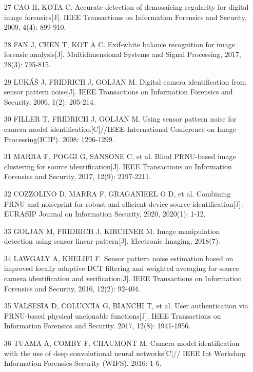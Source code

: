 \documentclass{article}
\begin{document}
\begin{itemize}
\item 
[27] CAO H, KOTA C. Accurate detection of demosaicing regularity for digital image forensics[J]. IEEE Transactions on Information Forensics and Security, 2009, 4(4): 899-910.

\item 
[28] FAN J, CHEN T, KOT A C. Exif-white balance recognition for image forensic analysis[J]. Multidimensional Systems and Signal Processing, 2017, 28(3): 795-815.

\item 
[29] LUKÁŠ J, FRIDRICH J, GOLJAN M. Digital camera identification from sensor pattern noise[J]. IEEE Transactions on Information Forensics and Security, 2006, 1(2): 205-214.

\item 
[30] FILLER T, FRIDRICH J, GOLJAN M. Using sensor pattern noise for camera model identification[C]//IEEE International Conference on Image Processing(ICIP). 2008: 1296-1299.

\item 
[31] MARRA F, POGGI G, SANSONE C, et al. Blind PRNU-based image clustering for source identification[J]. IEEE Transactions on Information Forensics and Security, 2017, 12(9): 2197-2211.

\item 
[32] COZZOLINO D, MARRA F, GRAGANIEEL O D, et al. Combining PRNU and noiseprint for robust and efficient device source identification[J]. EURASIP Journal on Information Security, 2020, 2020(1): 1-12.

\item 
[33] GOLJAN M, FRIDRICH J, KIRCHNER M. Image manipulation detection using sensor linear pattern[J]. Electronic Imaging, 2018(7).

\item 
[34] LAWGALY A, KHELIFI F. Sensor pattern noise estimation based on improved locally adaptive DCT filtering and weighted averaging for source camera identification and verification[J]. IEEE Transactions on Information Forensics and Security, 2016, 12(2): 92-404.

\item 
[35] VALSESIA D, COLUCCIA G, BIANCHI T, et al. User authentication via PRNU-based physical unclonable functions[J]. IEEE Transactions on Information Forensics and Security. 2017, 12(8): 1941-1956.

\item 
[36] TUAMA A, COMBY F, CHAUMONT M. Camera model identification with the use of deep convolutional neural networks[C]// IEEE Int Workshop Information Forensics Security (WIFS). 2016: 1-6.


\end{itemize}
\end{document}
